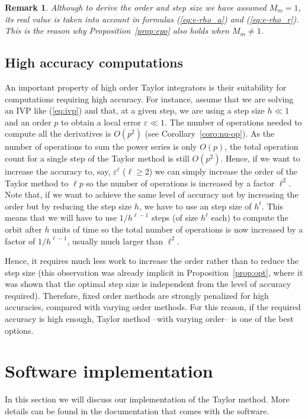 \documentclass[12pt,twoside]{article}
\newtheorem{remark}{Remark}[section]
\begin{document}
\begin{remark}
Although to derive the order and step size we have assumed $M_m=1$,
its real value is taken into account in formulas (\ref{eq:e-rho_a})
and (\ref{eq:e-rho_r}). This is the reason why
Proposition~\ref{prop:epo} also holds when $M_m\ne 1$.
\end{remark}

\subsection{High accuracy computations}\label{sec:hac}
An important property of high order Taylor integrators is their
suitability for computations requiring high accuracy. For instance,
assume that we are solving an IVP like (\ref{eq:ivp}) and that, at a
given step, we are using a step size $h\ll 1$ and an order $p$ to
obtain a local error $\varepsilon\ll 1$. The number of operations
needed to compute all the derivatives is $O(p^2)$ (see
Corollary~\ref{coro:nu-op}). As the number of operations to sum the
power series is only $O(p)$, the total operation count for a single
step of the Taylor method is still $O(p^2)$. Hence, if we want to
increase the accuracy to, say, $\varepsilon^{\ell}$ ($\ell\ge 2$) we
can simply increase the order of the Taylor method to $\ell p$ so the
number of operations is increased by a factor $\ell^2$. Note that, if
we want to achieve the same level of accuracy not by increasing the
order but by reducing the step size $h$, we have to use an step size
of $h^{\ell}$. This means that we will have to use $1/h^{\ell-1}$
steps (of size $h^{\ell}$ each) to compute the orbit after $h$ units
of time so the total number of operations is now increased by a factor
of $1/h^{\ell-1}$, usually much larger than $\ell^2$.

Hence, it requires much less work to increase the order rather than to
reduce the step size (this observation was already implicit in
Proposition~\ref{prop:opt}, where it was shown that the optimal step
size is independent from the level of accuracy required). Therefore,
fixed order methods are strongly penalized for high accuracies,
compared with varying order methods. For this reason, if the required
accuracy is high enough, Taylor method --with varying order-- is one
of the best options.


\section{Software implementation}\label{sec:si}
In this section we will discuss our implementation of the Taylor
method. More details can be found in the documentation that comes with
the software.
\end{document}
